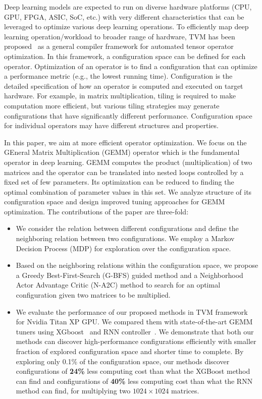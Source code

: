 Deep learning models are expected to run on diverse hardware platforms (CPU, GPU, FPGA, ASIC, SoC, etc.) with very different characteristics that can be leveraged to optimize various deep learning operations. To efficiently map deep learning operation/workload to broader range of hardware, TVM has been proposed~\cite{Chen18} as a general compiler framework for automated tensor operator optimization. In this framework, a configuration space can be defined for each operator. Optimization of an operator is to find a configuration that can optimize a performance metric (e.g., the lowest running time). Configuration is the detailed specification of how an operator is computed and executed on target hardware. For example, in matrix multiplication, tiling is required to make computation more efficient, but various tiling strategies may generate configurations that have significantly different performance. Configuration space for individual operators may have different structures and properties. %

In this paper, we aim at more efficient operator optimization. %
We focus on the GEneral Matrix Multiplication (GEMM) operator which is the fundamental operator in deep learning. GEMM computes the product (multiplication) of two matrices and the operator can be translated into nested loops controlled by a fixed set of few parameters. Its optimization can be reduced to finding the optimal combination of parameter values in this set. We analyze structure of its configuration space and design improved tuning approaches for GEMM optimization. The contributions of the paper are three-fold:
\begin{itemize}
\item We consider the relation between different configurations and define the neighboring relation between two configurations. We employ a Markov Decision Process (MDP) for exploration over the configuration space.   
\item Based on the neighboring relations within the configuration space, we propose a Greedy Best-First-Search (G-BFS) guided method and a Neighborhood Actor Advantage Critic (N-A2C) method to search for an optimal configuration given two matrices to be multiplied. %
\item We evaluate the performance of our proposed methods in TVM framework for Nvidia Titan XP GPU. We compared them with state-of-the-art GEMM tuners using XGboost~\cite{chen2016xgboost} and RNN controller~\cite{Chen18}. We demonstrate that both our methods can discover high-performance configurations efficiently with smaller fraction of explored configuration space and shorter time to complete. By exploring only 0.1\% of the configuration space, our methods discover configurations of {\bf 24\%} less computing cost than what the XGBoost method can find and configurations of {\bf 40\%} less computing cost than what the RNN method can find, for multiplying two $1024 \times 1024$ matrices. 
\end{itemize}